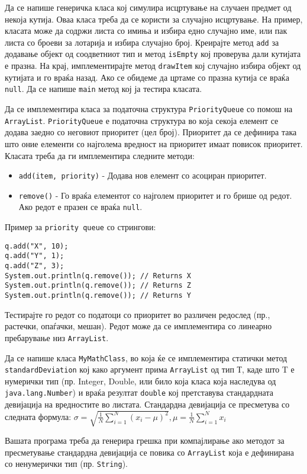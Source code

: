 \begin{questions}
\question
Да се напише генеричка класа кој симулира исцртување на случаен предмет од
некоја кутија. Оваа класа треба да се користи за случајно исцртување. На пример,
класата може да содржи листа со имиња и избира едно случајно име, или пак листа
со броеви за лотарија и избира случајно број. Креирајте метод \texttt{add} за
додавање објект од соодветниот тип и метод \texttt{isEmpty} кој проверува дали
кутијата е празна. На крај, имплементирајте метод \texttt{drawItem} кој случајно
избира објект од кутијата и го враќа назад. Ако се обидеме да цртаме со празна
кутија се враќа \texttt{null}. Да се напише \texttt{main} метод кој ја тестира
класата.


\question
Да се имплементира класа за податочна структура \texttt{PriorityQueue} со помош
на \texttt{ArrayList}. \texttt{PriorityQueue} е податочна структура во која
секоја елемент се додава заедно со неговиот приоритет (цел број). Приоритет да
се дефинира така што оние елементи со најголема вредност на приоритет имаат
повисок приоритет. Класата треба да ги имплементира следните методи:

\begin{itemize}
  \item \texttt{add(item, priority)} - Додава нов елемент со асоциран
  приоритет.
\item \texttt{remove()} - Го враќа елементот со најголем приоритет и го
брише од редот. Ако редот е празен се враќа \texttt{null}.
\end{itemize}

Пример за \texttt{priority queue} со стрингови: 
\begin{verbatim}
q.add("X", 10);
q.add("Y", 1);
q.add("Z", 3);
System.out.println(q.remove()); // Returns X
System.out.println(q.remove()); // Returns Z
System.out.println(q.remove()); // Returns Y
\end{verbatim}

Тестирајте го редот со податоци со приоритет во различен редослед (пр.,
растечки, опаѓачки, мешан). Редот може да се имплементира со линеарно
пребарување низ \texttt{ArrayList}. 



\question
Да се напише класа \texttt{MyMathClass}, во која ќе се имплементира статички
метод \texttt{standardDeviation} кој како аргумент прима \texttt{ArrayList} од
тип Т, каде што T е нумерички тип (пр. Integer, Double, или било која класа која
наследува од \texttt{java.lang.Number}) и враќа резултат \texttt{double} кој
претставува стандардната девијација на вредностите во листата. Стандардна
девијација се пресметува со следната формула: $\sigma =
  \sqrt{\frac{1}{N} \sum_{i=1}^N (x_i - \mu)^2}, \mu =
  \frac{1}{N} \sum_{i=1}^N x_i$

Вашата програма треба да генерира грешка при компајлирање ако методот за
пресметување стандардна девијација се повика со \texttt{ArrayList} која е
дефинирана со ненумерички тип (пр. \texttt{String}).



\end{questions}


